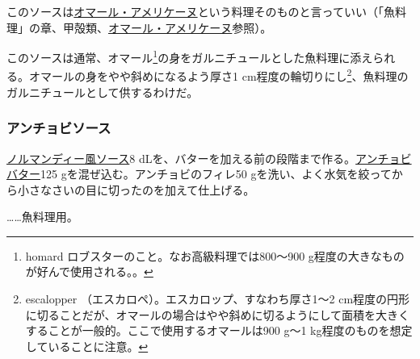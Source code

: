 \begin{recette}
このソースは\protect\hyperlink{homard-americaine}{オマール・アメリケーヌ}という料理そのものと言っていい（「魚料理」の章、甲殻類、\protect\hyperlink{homard-americaine}{オマール・アメリケーヌ}参照）。

このソースは通常、オマール\footnote{homard
  ロブスターのこと。なお高級料理では800〜900
  g程度の大きなものが好んで使用される。。}の身をガルニチュールとした魚料理に添えられる。オマールの身をやや斜めになるよう厚さ1
cm程度の輪切りにし\footnote{escalopper
  （エスカロペ）。エスカロップ、すなわち厚さ1〜2
  cm程度の円形に切ることだが、オマールの場合はやや斜めに切るようにして面積を大きくすることが一般的。ここで使用するオマールは900
  g〜1 kg程度のものを想定していることに注意。}、魚料理のガルニチュールとして供するわけだ。

\hypertarget{sauce-anchois}{%
\subsubsection{アンチョビソース}\label{sauce-anchois}}



\href{}{ノルマンディー風ソース}8
dLを、バターを加える前の段階まで作る。\href{}{アンチョビバター}125
gを混ぜ込む。アンチョビのフィレ50
gを洗い、よく水気を絞ってから小さなさいの目に切ったのを加えて仕上げる。

\ldots{}\ldots{}魚料理用。

\hypertarget{sauce-aurore}{%
}
\end{recette}
